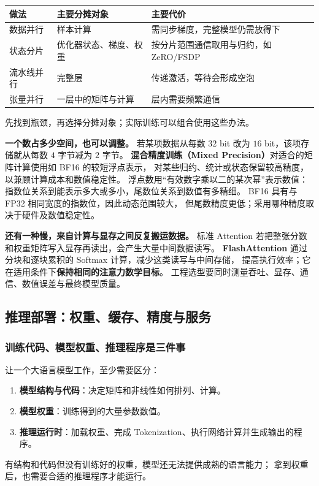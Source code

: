 \begin{center}\small
{}
\begin{tabularx}{\linewidth}{@{}p{31mm}p{35mm}>{\raggedright\arraybackslash}X@{}}
\toprule
做法 & 主要分摊对象 & 主要代价\\\midrule
数据并行 & 样本计算 & 需同步梯度，完整模型仍需放得下\\
状态分片 & 优化器状态、梯度、权重 & 按分片范围通信取用与归约，如 ZeRO/FSDP\\
流水线并行 & 完整层 & 传递激活，等待会形成空泡\\
张量并行 & 一层中的矩阵与计算 & 层内需要频繁通信\\
\bottomrule
\end{tabularx}
\end{center}
先找到瓶颈，再选择分摊对象；实际训练可以组合使用这些办法。

\label{concept:mixed-precision}
\textbf{一个数占多少空间，也可以调整。}
若某项数据从每数 $32$ bit 改为 $16$ bit，该项存储就从每数 $4$ 字节减为 $2$ 字节。
\textbf{混合精度训练（Mixed Precision）}对适合的矩阵计算使用如 BF16 的较短浮点表示，
对某些归约、统计或状态保留较高精度，以兼顾计算成本和数值稳定性。
浮点数用“有效数字乘以二的某次幂”表示数值：指数位关系到能表示多大或多小，尾数位关系到数值有多精细。
BF16 具有与 FP32 相同宽度的指数位，因此动态范围较大，
但尾数精度更低；采用哪种精度取决于硬件及数值稳定性。

\textbf{还有一种慢，来自计算与显存之间反复搬运数据。}
标准 Attention 若把整张分数和权重矩阵写入显存再读出，会产生大量中间数据读写。
\textbf{FlashAttention} 通过分块和逐块累积的 Softmax 计算，减少这类读写与中间存储，
提高执行效率；它在适用条件下\textbf{保持相同的注意力数学目标}。
工程选型要同时测量吞吐、显存、通信、数值误差与最终模型质量。

\subsection{推理部署：权重、缓存、精度与服务}
\subsubsection*{训练代码、模型权重、推理程序是三件事}

让一个大语言模型工作，至少需要区分：
\begin{enumerate}
\item \textbf{模型结构与代码}：决定矩阵和非线性如何排列、计算。
\item \textbf{模型权重}：训练得到的大量参数数值。
\item \textbf{推理运行时}：加载权重、完成 Tokenization、执行网络计算并生成输出的程序。
\end{enumerate}
有结构和代码但没有训练好的权重，模型还无法提供成熟的语言能力；
拿到权重后，也需要合适的推理程序才能运行。

